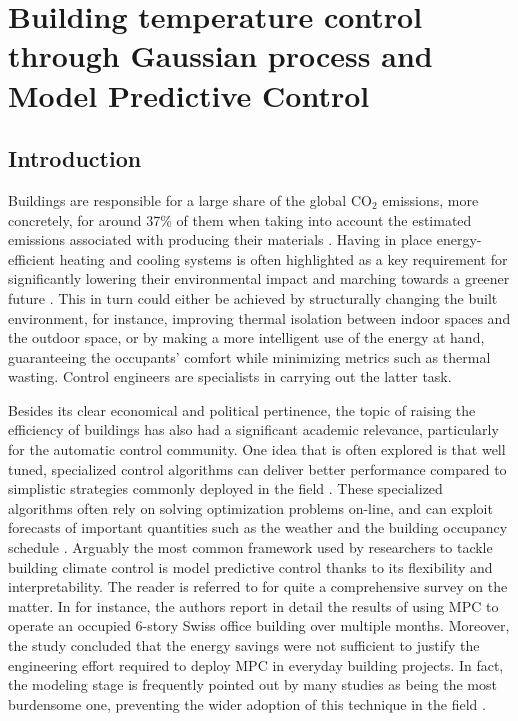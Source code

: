 \cleardoublepage
\chapter{Building temperature control through Gaussian process and Model Predictive Control}

\section{Introduction}

Buildings are responsible for a large share of the global CO$_2$ emissions, more concretely, for around 37\% of them when taking into account the estimated emissions associated with producing their materials \citep[§3.2]{united2022}. Having in place energy-efficient heating and cooling systems is often highlighted as a key requirement for significantly lowering their environmental impact and marching towards a greener future \citep{iea2022}. This in turn could either be achieved by structurally changing the built environment, for instance, improving thermal isolation between indoor spaces and the outdoor space, or by making a more intelligent use of the energy at hand, guaranteeing the occupants' comfort while minimizing metrics such as thermal wasting. Control engineers are specialists in carrying out the latter task.

Besides its clear economical and political pertinence, the topic of raising the efficiency of buildings has also had a significant academic relevance, particularly for the automatic control community. One idea that is often explored is that well tuned, specialized control algorithms can deliver better performance compared to simplistic strategies commonly deployed in the field \citep{stluka2018architectures}. These specialized algorithms often rely on solving optimization problems on-line, and can exploit forecasts of important quantities such as the weather and the building occupancy schedule \citep{oldewurtel2012use}. Arguably the most common framework used by researchers to tackle building climate control is model predictive control thanks to its flexibility and interpretability. The reader is referred to \cite{drgovna2020all} for quite a comprehensive survey on the matter. In \cite{sturzenegger2015model} for instance, the authors report in detail the results of using MPC to operate an occupied 6-story Swiss office building over multiple months. Moreover, the study concluded that the energy savings were not sufficient to justify the engineering effort required to deploy MPC in everyday building projects. In fact, the modeling stage is frequently pointed out by many studies as being the most burdensome one, preventing the wider adoption of this technique in the field \citep{drgovna2020all,bunning2020experimental}.

